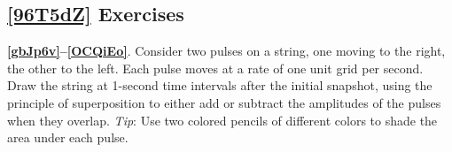 \documentclass{article}
\numberwithin{equation}{section}
\numberwithin{figure}{section}
\begin{document}
\subsection*{\ref{96T5dZ} Exercises}

{\color{white}{

\begin{exercise} \label{gbJp6v} 
\end{exercise} 

\vspace{-1cm}

\begin{exercise} \label{8e1BSx} 
\end{exercise} 

\vspace{-1cm}

\begin{exercise} \label{oRb52g} 
\end{exercise} 

\vspace{-1cm}

\begin{exercise} \label{vTVEZJ} 
\end{exercise} 

\vspace{-1cm}

\begin{exercise} \label{nd0J3q} 
\end{exercise} 

\vspace{-1cm}

\begin{exercise} \label{OCQiEo} 
\end{exercise}
}}

\textbf{\ref{gbJp6v}--\ref{OCQiEo}}. Consider two pulses on a string, one moving to the right, the other to the left. Each pulse moves at a rate of one unit grid per second. Draw the string at 1-second time intervals after the initial snapshot, using the principle of superposition to either add or subtract the amplitudes of the pulses when they overlap. \textit{Tip}: Use two colored pencils of different colors to shade the area under each pulse.


\clearpage
\end{document}
